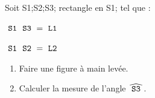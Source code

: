 \documentclass[exercice]{thedocument}%
\begin{document}
%
Soit \<S1;\<S2;\<S3; rectangle en \<S1; tel que :\par\smallskip
\hskip20pt$\text{\<S1;\<S3;}=\text{\<L1;}$\par\smallskip
\hskip20pt$\text{\<S1;\<S2;}=\text{\<L2;}$\par\bigskip
\begin{enumerate}
    \item Faire une figure à main levée.
    \item Calculer la mesure de l'angle $\widehat{\text{\<S3;}}$.
\end{enumerate}
\end{document}
